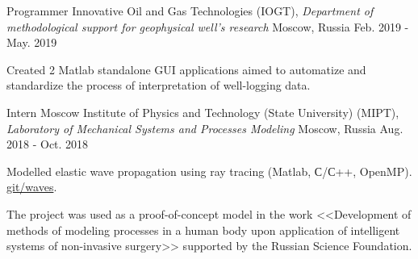 \begin{cventries}

  \cventry
    {Programmer} %
    {Innovative Oil and Gas Technologies (IOGT), \newline \textit{Department of methodological support for geophysical well's research}} %
    {Moscow, Russia} %
    {Feb. 2019 - May. 2019} %
    {
      \begin{cvitems} %
        \item {Created 2 Matlab standalone GUI applications aimed to automatize and standardize the process of interpretation of well-logging data.}
      \end{cvitems}
    }


  \cventry
    {Intern} %
    {Moscow Institute of Physics and Technology (State University) (MIPT), \newline \textit{Laboratory of Mechanical Systems and Processes Modeling}} %
    {Moscow, Russia} %
    {Aug. 2018 - Oct. 2018} %
    {
      \begin{cvitems} %
        \item {Modelled elastic wave propagation using ray tracing (Matlab, С/С++, OpenMP). \href{https://github.com/PolyachenkoYA/geo}{git/waves}.}
        \item {The project was used as a proof-of-concept model in the work <<Development of methods of modeling processes in a human body upon application of intelligent systems of non-invasive surgery>> supported by the Russian Science Foundation.}
      \end{cvitems}
    }

\end{cventries}
